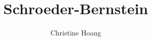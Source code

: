 \documentclass{article}
\title{Schroeder-Bernstein}
\author{Christine Hoang}
\begin{document}
\maketitle

\section{}
\end{document}
